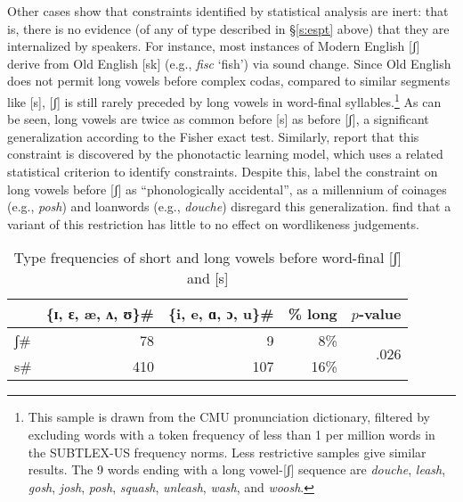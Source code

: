 Other cases show that constraints identified by statistical analysis are inert: that is, there is no evidence (of any of type described in \S\ref{s:espt} above) that they are internalized by speakers.
For instance, most instances of Modern English [ʃ] derive from Old English [sk] (e.g., \emph{fisc} `fish') via sound change.
Since Old English does not permit long vowels before complex codas, compared to similar segments like [s], [ʃ] is still rarely preceded by long vowels in word-final syllables.\footnote{
    This sample is drawn from the CMU pronunciation dictionary, filtered by excluding words with a token frequency of less than 1 per million words in the SUBTLEX-US frequency norms.
    Less restrictive samples give similar results.
    The 9 words ending with a long vowel-[ʃ] sequence are \emph{douche}, \emph{leash}, \emph{gosh}, \emph{josh}, \emph{posh}, \emph{squash}, \emph{unleash}, \emph{wash}, and \emph{woosh}.}
As can be seen, long vowels are twice as common before [s] as before [ʃ], a significant generalization according to the Fisher exact test.
Similarly, \citet{HayesInPress} report that this constraint is discovered by the \citet{Hayes2008a} phonotactic learning model, which uses a related statistical criterion to identify constraints.
Despite this, \citet{Iverson2005} label the constraint on long vowels before [ʃ] as ``phonologically accidental'', as a millennium of coinages (e.g., \emph{posh}) and loanwords (e.g., \emph{douche}) disregard this generalization.
\citet{HayesInPress} find that a variant of this restriction has little to no effect on wordlikeness judgements.

\begin{table}[t]
\centering
\begin{tabular}{l r r r r}
\toprule
          & \{ɪ, ɛ, æ, ʌ, ʊ\}\gap{}\# & \{i, e, ɑ, ɔ, u\}\gap{}\# & \% long & $p$-value \\
\midrule
\gap{}ʃ\# & 78                & 9                 & 8\%      & \multirow{2}{*}{.026} \\
\gap{}s\# & 410               & 107               & 16\%     & \\
\bottomrule
\end{tabular}
\caption{Type frequencies of short and long vowels before word-final [ʃ] and [s]}
\label{ssh}
\end{table}

